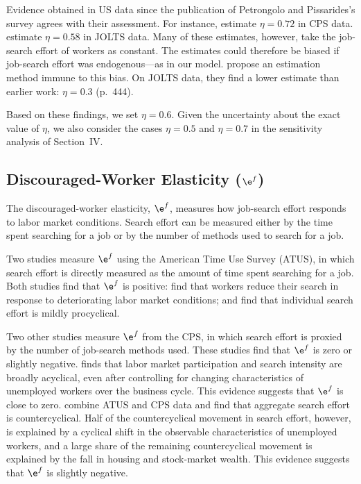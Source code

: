 \documentclass[letterpaper,12pt,leqno]{article}
\begin{document}
Evidence obtained in US data since the publication of Petrongolo and Pissarides's survey agrees with their assessment. For instance, \citet[p.~32]{S05} estimate $\eta=0.72$ in CPS data. \citet[p.~638]{RS10} estimate $\eta=0.58$ in JOLTS data. Many of these estimates, however, take the job-search effort of workers as constant. The estimates could therefore be biased if job-search effort was endogenous---as in our model. \citet{BJP11} propose an estimation method immune to this bias. On JOLTS data, they find a lower estimate than earlier work: $\eta=0.3$ (p.~444). 

Based on these findings, we set $\eta=0.6$. Given the uncertainty about the exact value of $\eta$, we also consider the cases $\eta=0.5$ and $\eta=0.7$ in the sensitivity analysis of Section~IV.

\subsection{Discouraged-Worker Elasticity ($\e^{f}$)}

The discouraged-worker elasticity, $\e^{f}$, measures how job-search effort responds to labor market conditions. Search effort can be measured either by the time spent searching for a job or by the number of methods used to search for a job.

Two studies measure $\e^{f}$ using the American Time Use Survey (ATUS), in which search effort is directly measured as the amount of time spent searching for a job.  Both studies find that $\e^{f}$ is positive: \citet{DK13} find that workers reduce their search in response to deteriorating labor market conditions; and \citet{GL15} find that individual search effort is mildly procyclical. 

Two other studies measure $\e^{f}$ from the CPS, in which search effort is proxied by the number of job-search methods used. These studies find that $\e^{f}$ is zero or slightly negative. \citet{S04} finds that labor market participation and search intensity are broadly acyclical, even after controlling for changing characteristics of unemployed workers over the business cycle. This evidence suggests that $\e^{f}$ is close to zero. \citet{MPS13} combine ATUS and CPS data and find that aggregate search effort is countercyclical. Half of the countercyclical movement in search effort, however, is explained by a cyclical shift in the observable characteristics of unemployed workers, and a large share of the remaining countercyclical movement is explained by the fall in housing and stock-market wealth. This evidence suggests that $\e^{f}$ is slightly negative. 
\end{document}
